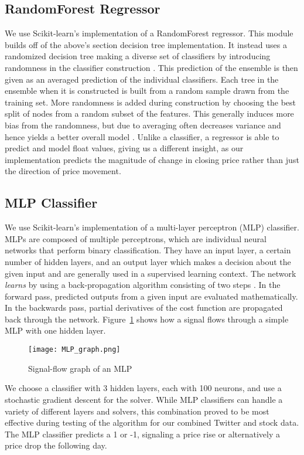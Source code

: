 \documentclass[../thesis.tex]{subfiles}
\begin{document}
\subsection{RandomForest Regressor}
We use Scikit-learn's implementation of a RandomForest regressor. This module builds off of the above's section decision tree implementation. It instead uses a randomized decision tree making a diverse set of classifiers by introducing randomness in the classifier construction \cite{PedregosaFABIANPEDREGOSA2011}. This prediction of the ensemble is then given as an averaged prediction of the individual classifiers. Each tree in the ensemble when it is constructed is built from a random sample drawn from the training set. More randomness is added during construction by choosing the best split of nodes from a random subset of the features. This generally induces more bias from the randomness, but due to averaging often decreases variance and hence yields a better overall model \cite{PedregosaFABIANPEDREGOSA2011}. Unlike a classifier, a regressor is able to predict and model float values, giving us a different insight, as our implementation predicts the magnitude of change in closing price rather than just the direction of price movement. 

\subsection{MLP Classifier}
We use Scikit-learn's implementation of a multi-layer perceptron (MLP) classifier. MLPs are composed of multiple perceptrons, which are individual neural networks that perform binary classification. They have an input layer, a certain number of hidden layers, and an output layer which makes a decision about the given input and are generally used in a supervised learning context. The network \textit{learns} by using a back-propagation algorithm consisting of two steps \cite{Honkela2001}. In the forward pass, predicted outputs from a given input are evaluated mathematically. In the backwards pass, partial derivatives of the cost function are propagated back through the network. Figure~\ref{MLPgraph} shows how a signal flows through a simple MLP with one hidden layer. 

\begin{figure}[h]
\centering
\texttt{[image: MLP\_graph.png]}
\caption{Signal-flow graph of an MLP \label{overflow}}
\label{MLPgraph}
\end{figure}

We choose a classifier with 3 hidden layers, each with 100 neurons, and use a stochastic gradient descent for the solver. While MLP classifiers can handle a variety of different layers and solvers, this combination proved to be most effective during testing of the algorithm for our combined Twitter and stock data. The MLP classifier predicts a 1 or -1, signaling a price rise or alternatively a price drop the following day. 
\end{document}
